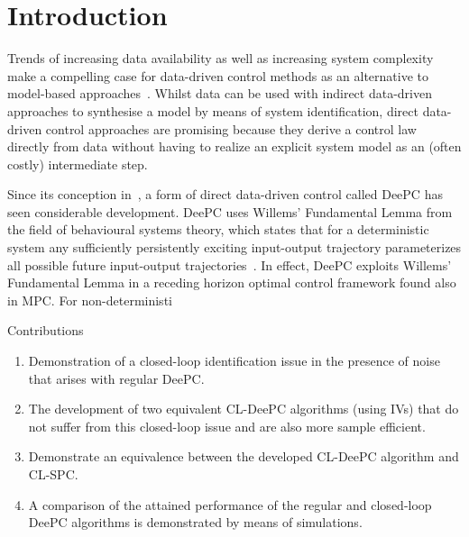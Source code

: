 \section{Introduction}
Trends of increasing data availability as well as increasing system complexity make a compelling case for data-driven control methods as an alternative to model-based approaches~\cite{Hou2013}. Whilst data can be used with indirect data-driven approaches to synthesise a model by means of system identification, direct data-driven control approaches are promising because they derive a control law directly from data without having to realize an explicit system model as an (often costly) intermediate step.

Since its conception in~\cite{Coulson2019}, a form of direct data-driven control called \ac{DeePC} has seen considerable development. \ac{DeePC} uses Willems' Fundamental Lemma from the field of behavioural systems theory, which states that for a deterministic system any sufficiently persistently exciting input-output trajectory parameterizes all possible future input-output trajectories~\cite{Willems2005}. In effect, \ac{DeePC} exploits Willems' Fundamental Lemma in a receding horizon optimal control framework found also in \ac{MPC}. For non-deterministi


Contributions
\begin{enumerate}
\item Demonstration of a closed-loop identification issue in the presence of noise that arises with regular \ac{DeePC}.
\item The development of two equivalent \ac{CL-DeePC} algorithms (using \ac{IVs}) that do not suffer from this closed-loop issue and are also more sample efficient.
\item Demonstrate an equivalence between the developed \ac{CL-DeePC} algorithm and \ac{CL-SPC}.
\item A comparison of the attained performance of the regular and closed-loop \ac{DeePC} algorithms is demonstrated by means of simulations.
\end{enumerate}